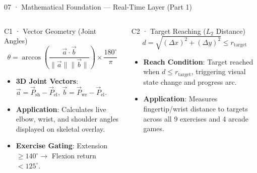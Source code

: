 \documentclass[aspectratio=169,11pt]{beamer}
\begin{document}
\begin{frame}{07 · Mathematical Foundation — Real-Time Layer (Part 1)}
\begin{columns}[T]
\begin{block}{C1 · Vector Geometry (Joint Angles)}
$$\theta = \arccos\left(\frac{\vec{a} \cdot \vec{b}}{\|\vec{a}\| \|\vec{b}\|}\right) \times \frac{180^\circ}{\pi}$$
\begin{itemize}
    \setlength{\itemsep}{2pt}
    \item \textbf{3D Joint Vectors}: $\vec{a} = \vec{P}_{\text{sh}} - \vec{P}_{\text{el}}$, $\vec{b} = \vec{P}_{\text{wr}} - \vec{P}_{\text{el}}$.
    \item \textbf{Application}: Calculates live elbow, wrist, and shoulder angles displayed on skeletal overlay.
    \item \textbf{Exercise Gating}: Extension $\ge 140^\circ \rightarrow$ Flexion return $< 125^\circ$.
\end{itemize}
\end{block}

\begin{block}{C2 · Target Reaching ($L_2$ Distance)}
$$d = \sqrt{(\Delta x)^2 + (\Delta y)^2} \le r_{\text{target}}$$
\begin{itemize}
    \setlength{\itemsep}{2pt}
    \item \textbf{Reach Condition}: Target reached when $d \le r_{\text{target}}$, triggering visual state change and progress arc.
    \item \textbf{Application}: Measures fingertip/wrist distance to targets across all 9 exercises and 4 arcade games.
\end{itemize}
\end{block}
\end{columns}
\end{frame}
\end{document}
